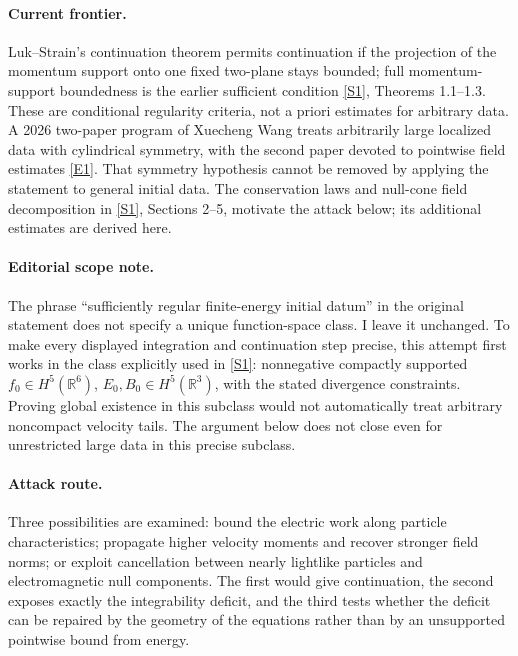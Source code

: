 \documentclass[11pt,a4paper]{article}
\newcommand{\R}{\mathbb{R}}
\newcommand{\sref}[2]{\hyperlink{source:#1:#2}{[S#2]}}
\newcommand{\eref}[2]{\hyperlink{extra:#1:#2}{[E#2]}}
\begin{document}
\paragraph{Current frontier.}
Luk--Strain's continuation theorem permits continuation if the projection
of the momentum support onto one fixed two-plane stays bounded; full
momentum-support boundedness is the earlier sufficient condition
\sref{30006039}{1}, Theorems 1.1--1.3. These are conditional regularity criteria,
not a priori estimates for arbitrary data. A 2026 two-paper program of
Xuecheng Wang treats arbitrarily large localized data with cylindrical
symmetry, with the second paper devoted to pointwise field estimates
\eref{30006039}{1}. That symmetry hypothesis cannot be removed by applying the
statement to general initial data. The conservation laws and null-cone
field decomposition in \sref{30006039}{1}, Sections 2--5, motivate the attack
below; its additional estimates are derived here.

\paragraph{Editorial scope note.}
The phrase ``sufficiently regular finite-energy initial datum'' in the
original statement does not specify a unique function-space class. I leave
it unchanged. To make every displayed integration and continuation step
precise, this attempt first works in the class explicitly used in
\sref{30006039}{1}: nonnegative compactly supported $f_0\in H^5(\R^6)$,
$E_0,B_0\in H^5(\R^3)$, with the stated divergence constraints. Proving
global existence in this subclass would not automatically treat arbitrary
noncompact velocity tails. The argument below does not close even for
unrestricted large data in this precise subclass.

\paragraph{Attack route.}
Three possibilities are examined: bound the electric work along particle
characteristics; propagate higher velocity moments and recover stronger
field norms; or exploit cancellation between nearly lightlike particles
and electromagnetic null components. The first would give continuation,
the second exposes exactly the integrability deficit, and the third tests
whether the deficit can be repaired by the geometry of the equations rather
than by an unsupported pointwise bound from energy.
\end{document}
